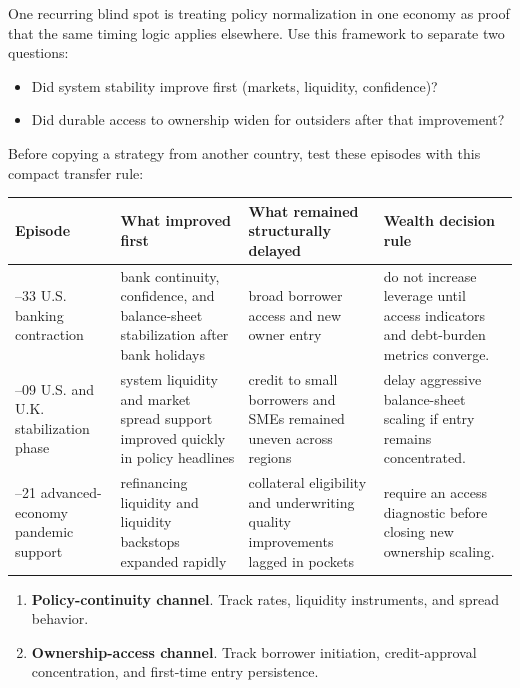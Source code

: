 \documentclass[11pt,openany]{book}
\begin{document}
One recurring blind spot is treating policy normalization in one economy as proof that the same timing logic applies elsewhere.
Use this framework to separate two questions:

\begin{itemize}
  \item Did system stability improve first (markets, liquidity, confidence)?
  \item Did durable access to ownership widen for outsiders after that improvement?
\end{itemize}

Before copying a strategy from another country, test these episodes with this compact transfer rule:

\begin{center}
\small
\begin{tabularx}{\textwidth}{>{\raggedright\arraybackslash}p{}>{\raggedright\arraybackslash}p{}>{\raggedright\arraybackslash}p{}X}
\toprule
\textbf{Episode} & \textbf{What improved first} & \textbf{What remained structurally delayed} & \textbf{Wealth decision rule} \\
\midrule
1930--33 U.S. banking contraction & bank continuity, confidence, and balance-sheet stabilization after bank holidays & broad borrower access and new owner entry & do not increase leverage until access indicators and debt-burden metrics converge. \\
2008--09 U.S. and U.K. stabilization phase & system liquidity and market spread support improved quickly in policy headlines & credit to small borrowers and SMEs remained uneven across regions & delay aggressive balance-sheet scaling if entry remains concentrated. \\
2020--21 advanced-economy pandemic support & refinancing liquidity and liquidity backstops expanded rapidly & collateral eligibility and underwriting quality improvements lagged in pockets & require an access diagnostic before closing new ownership scaling. \\
\bottomrule
\end{tabularx}
\normalsize
\end{center}

\begin{enumerate}
  \item \textbf{Policy-continuity channel}. Track rates, liquidity instruments, and spread behavior.
  \item \textbf{Ownership-access channel}. Track borrower initiation, credit-approval concentration, and first-time entry persistence.
\end{enumerate}
\end{document}
